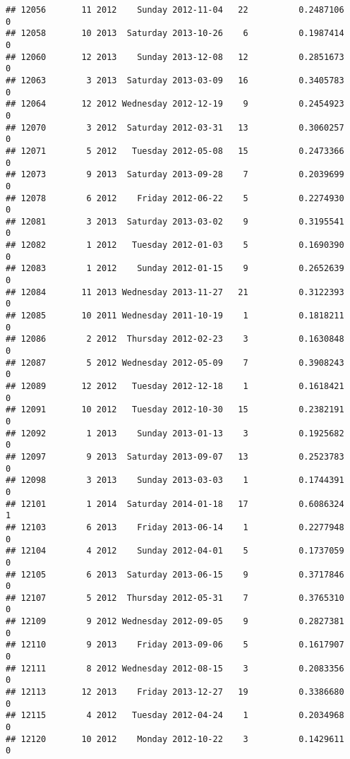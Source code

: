 \documentclass[
]{article}
\begin{document}
\begin{verbatim}
## 12056       11 2012    Sunday 2012-11-04   22          0.2487106             0
## 12058       10 2013  Saturday 2013-10-26    6          0.1987414             0
## 12060       12 2013    Sunday 2013-12-08   12          0.2851673             0
## 12063        3 2013  Saturday 2013-03-09   16          0.3405783             0
## 12064       12 2012 Wednesday 2012-12-19    9          0.2454923             0
## 12070        3 2012  Saturday 2012-03-31   13          0.3060257             0
## 12071        5 2012   Tuesday 2012-05-08   15          0.2473366             0
## 12073        9 2013  Saturday 2013-09-28    7          0.2039699             0
## 12078        6 2012    Friday 2012-06-22    5          0.2274930             0
## 12081        3 2013  Saturday 2013-03-02    9          0.3195541             0
## 12082        1 2012   Tuesday 2012-01-03    5          0.1690390             0
## 12083        1 2012    Sunday 2012-01-15    9          0.2652639             0
## 12084       11 2013 Wednesday 2013-11-27   21          0.3122393             0
## 12085       10 2011 Wednesday 2011-10-19    1          0.1818211             0
## 12086        2 2012  Thursday 2012-02-23    3          0.1630848             0
## 12087        5 2012 Wednesday 2012-05-09    7          0.3908243             0
## 12089       12 2012   Tuesday 2012-12-18    1          0.1618421             0
## 12091       10 2012   Tuesday 2012-10-30   15          0.2382191             0
## 12092        1 2013    Sunday 2013-01-13    3          0.1925682             0
## 12097        9 2013  Saturday 2013-09-07   13          0.2523783             0
## 12098        3 2013    Sunday 2013-03-03    1          0.1744391             0
## 12101        1 2014  Saturday 2014-01-18   17          0.6086324             1
## 12103        6 2013    Friday 2013-06-14    1          0.2277948             0
## 12104        4 2012    Sunday 2012-04-01    5          0.1737059             0
## 12105        6 2013  Saturday 2013-06-15    9          0.3717846             0
## 12107        5 2012  Thursday 2012-05-31    7          0.3765310             0
## 12109        9 2012 Wednesday 2012-09-05    9          0.2827381             0
## 12110        9 2013    Friday 2013-09-06    5          0.1617907             0
## 12111        8 2012 Wednesday 2012-08-15    3          0.2083356             0
## 12113       12 2013    Friday 2013-12-27   19          0.3386680             0
## 12115        4 2012   Tuesday 2012-04-24    1          0.2034968             0
## 12120       10 2012    Monday 2012-10-22    3          0.1429611             0

\end{verbatim}
\end{document}
